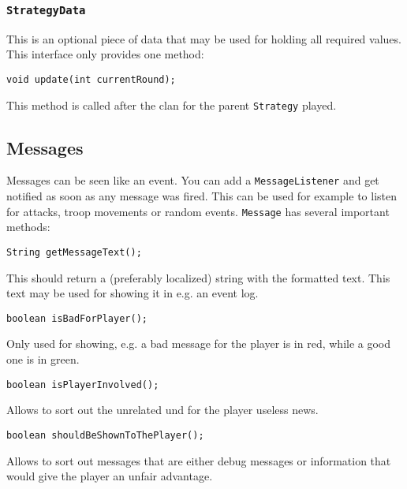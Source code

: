\documentclass{article}
\begin{document}
\subsubsection{\texttt{StrategyData}}
This is an optional piece of data that may be used for holding all required values. This interface only provides one method:
\begin{verbatim}
void update(int currentRound);
\end{verbatim}
This method is called after the clan for the parent \texttt{Strategy} played.

\subsection{Messages}
Messages can be seen like an event. You can add a \texttt{MessageListener} and get notified as soon as any message was fired. This can be used for example to listen for attacks, troop movements or random events.
\texttt{Message} has several important methods:
\begin{verbatim}
String getMessageText();
\end{verbatim}
This should return a (preferably localized) string with the formatted text. This text may be used for showing it in e.g. an event log.
\begin{verbatim}
boolean isBadForPlayer();
\end{verbatim}
Only used for showing, e.g. a bad message for the player is in red, while a good one is in green.
\begin{verbatim}
boolean isPlayerInvolved();
\end{verbatim}
Allows to sort out the unrelated und for the player useless news.
\begin{verbatim}
boolean shouldBeShownToThePlayer();
\end{verbatim}
Allows to sort out messages that are either debug messages or information that would give the player an unfair advantage.
\end{document}
